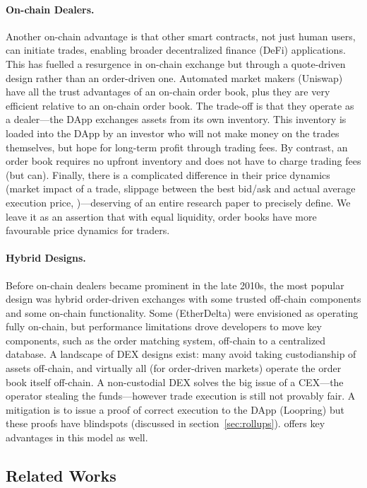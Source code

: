 \paragraph{On-chain Dealers.} Another on-chain advantage is that other smart contracts, not just human users, can initiate trades, enabling broader decentralized finance (DeFi) applications. This has fuelled a resurgence in on-chain exchange but through a quote-driven design rather than an order-driven one. Automated market makers  (\eg Uniswap) have all the trust advantages of an on-chain order book, plus they are very efficient relative to an on-chain order book. The trade-off is that they operate as a dealer---the DApp exchanges assets from its own inventory. This inventory is loaded into the DApp by an investor who will not make money on the trades themselves, but hope for long-term profit through trading fees. By contrast, an order book requires no upfront inventory and does not have to charge trading fees (but can). Finally, there is a complicated difference in their price dynamics (\eg market impact of a trade, slippage between the best bid/ask and actual average execution price, \etc)---deserving of an entire research paper to precisely define. We leave it as an assertion that with equal liquidity, order books have more favourable price dynamics for traders.

\paragraph{Hybrid Designs.} Before on-chain dealers became prominent in the late 2010s, the most popular design was hybrid order-driven exchanges with some trusted off-chain components and some on-chain functionality. Some (\eg EtherDelta) were envisioned as operating fully on-chain, but performance limitations drove developers to move key components, such as the order matching system, off-chain to a centralized database. A landscape of DEX designs exist: many avoid taking custodianship of assets off-chain, and virtually all (for order-driven markets) operate the order book itself off-chain. A non-custodial DEX solves the big issue of a CEX---the operator stealing the funds---however trade execution is still not provably fair. A mitigation is to issue a proof of correct execution to the DApp (\eg Loopring) but these proofs have blindspots (discussed in section~\ref{sec:rollups}). \cm offers key advantages in this model as well. 

\subsection{Related Works}

